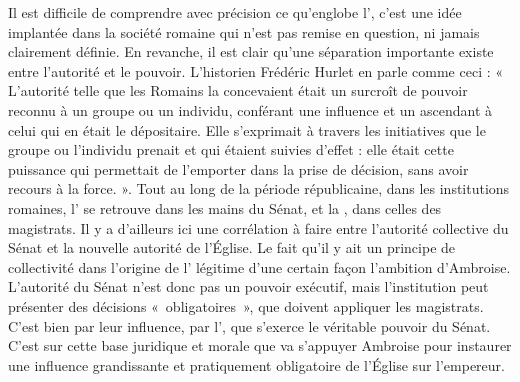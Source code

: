 Il est difficile de comprendre avec précision ce qu’englobe l’, c’est une idée implantée dans la société romaine qui n’est pas remise en question, ni jamais clairement définie. En revanche, il est clair qu’une séparation importante existe entre l’autorité et le pouvoir. L'historien Frédéric Hurlet en parle comme ceci : « L’autorité telle que les Romains la concevaient était un surcroît de pouvoir reconnu à un groupe ou un individu, conférant une influence et un ascendant à celui qui en était le dépositaire. Elle s’exprimait à travers les initiatives que le groupe ou l’individu prenait et qui étaient suivies d’effet : elle était cette puissance qui permettait de l’emporter dans la prise de décision, sans avoir recours à la force. ». \autocite{christol_histoire_2021} Tout au long de la période républicaine, dans les institutions romaines, l’ se retrouve dans les mains du Sénat, et la , dans celles des magistrats. Il y a d'ailleurs ici une corrélation à faire entre l'autorité collective du Sénat et la nouvelle autorité de l'Église. Le fait qu'il y ait un principe de collectivité dans l'origine de l' légitime d'une certain façon l'ambition d'Ambroise. L’autorité du Sénat n’est donc pas un pouvoir exécutif, mais l’institution peut présenter des décisions «~obligatoires~», que doivent appliquer les magistrats. C’est bien par leur influence, par l’, que s’exerce le véritable pouvoir du Sénat. C’est sur cette base juridique et morale que va s’appuyer Ambroise pour instaurer une influence grandissante et pratiquement obligatoire de l’Église sur l’empereur.

\bigskip

